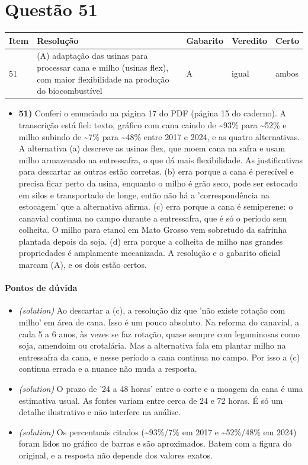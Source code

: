 \documentclass{article}%
\begin{document}
\section*{Questão 51}%
\begin{longtable}{@{}p{} p{} p{} p{} p{}@{}}\toprule Item & Resolução & Gabarito & Veredito & Certo \\ \midrule
51 & (A) adaptação das usinas para processar cana e milho (usinas flex), com maior flexibilidade na produção do biocombustível & A & igual & ambos \\
\bottomrule\end{longtable}%
\begin{itemize}%
\item%
\textbf{51)} Conferi o enunciado na página 17 do PDF (página 15 do caderno). A transcrição está fiel: texto, gráfico com cana caindo de \textasciitilde{}93\% para \textasciitilde{}52\% e milho subindo de \textasciitilde{}7\% para \textasciitilde{}48\% entre 2017 e 2024, e as quatro alternativas. A alternativa (a) descreve as usinas flex, que moem cana na safra e usam milho armazenado na entressafra, o que dá mais flexibilidade. As justificativas para descartar as outras estão corretas. (b) erra porque a cana é perecível e precisa ficar perto da usina, enquanto o milho é grão seco, pode ser estocado em silos e transportado de longe, então não há a 'correspondência na estocagem' que a alternativa afirma. (c) erra porque a cana é semiperene: o canavial continua no campo durante a entressafra, que é só o período sem colheita. O milho para etanol em Mato Grosso vem sobretudo da safrinha plantada depois da soja. (d) erra porque a colheita de milho nas grandes propriedades é amplamente mecanizada. A resolução e o gabarito oficial marcam (A), e os dois estão certos.%
\end{itemize}%
\paragraph{Pontos de dúvida}%
\begin{itemize}%
\item%
\textit{(solution)} Ao descartar a (c), a resolução diz que 'não existe rotação com milho' em área de cana. Isso é um pouco absoluto. Na reforma do canavial, a cada 5 a 6 anos, às vezes se faz rotação, quase sempre com leguminosas como soja, amendoim ou crotalária. Mas a alternativa fala em plantar milho na entressafra da cana, e nesse período a cana continua no campo. Por isso a (c) continua errada e a nuance não muda a resposta.%
\item%
\textit{(solution)} O prazo de '24 a 48 horas' entre o corte e a moagem da cana é uma estimativa usual. As fontes variam entre cerca de 24 e 72 horas. É só um detalhe ilustrativo e não interfere na análise.%
\item%
\textit{(solution)} Os percentuais citados (\textasciitilde{}93\%/7\% em 2017 e \textasciitilde{}52\%/48\% em 2024) foram lidos no gráfico de barras e são aproximados. Batem com a figura do original, e a resposta não depende dos valores exatos.%
\end{itemize}%
\end{document}
